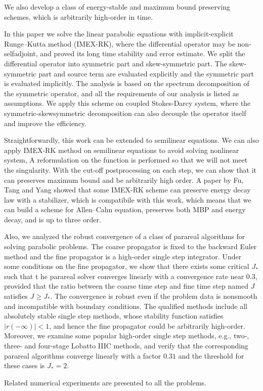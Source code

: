 We also develop a class of energy-stable and maximum bound preserving schemes, which is arbitrarily high-order in time.

In this paper we solve the linear parabolic equations with implicit-explicit Runge--Kutta method (IMEX-RK), 
where the differential operator may be non-selfadjoint, and proved its long time stability and error estimate. 
We split the differential operator into symmetric part and skew-symmetric part. 
The skew-symmetric part and source term are evaluated explicitly and the symmetric part is evaluated implicitly. 
The analysis is based on the spectrum decomposition of the symmetric operator, 
and all the requirements of our analysis is listed as assumptions. 
We apply this scheme on coupled Stokes-Darcy system, 
where the symmetric-skewsymmetric decomposition can also decouple the operator itself and improve the efficiency. 

Straightforwardly, this work can be extended to semilinear equations. 
We can also apply IMEX-RK method on semilinear equations to avoid solving nonlinear system, 
A reformulation on the function is performed so that we will not meet the singularity. 
With the cut-off postprocessing on each step, 
we can show that it can preserves maximum bound and be arbitrarily high order. 
A paper by Fu, Tang and Yang showed that some IMEX-RK scheme can 
preserve energy decay law with a stabilizer, which is compatibile 
with this work, 
which means that we can build a scheme for Allen--Cahn equation, 
preserves both MBP and energy decay, and is up to three order. 

Also, we analyzed the robust convergence of a class of 
parareal algorithms for solving parabolic problems. 
The coarse propagator is fixed to the backward Euler method 
and the fine propagator is a high-order single step integrator. 
Under some conditions on the fine propagator, 
we show that there exists some critical $J_*$ such that t
he parareal solver converges linearly with a convergence 
rate near $0.3$, provided that the ratio between the coarse 
time step and fine time step named $J$ satisfies $J \ge J_*$. 
The convergence is robust even if the problem data is nonsmooth 
and incompatible with boundary conditions. 
The qualified methods include all absolutely stable single 
step methods, whose stability function satisfies 
$|r(-\infty)|<1$, and hence the fine propagator could be 
arbitrarily high-order. Moreover, we examine some popular 
high-order single step methods, e.g., two-, three- and 
four-stage Lobatto IIIC methods, and verify that the 
corresponding parareal algorithms converge linearly with a 
factor $0.31$ and the threshold for these cases is $J_* = 2$. 

Related numerical experiments are presented to all the problems. 

